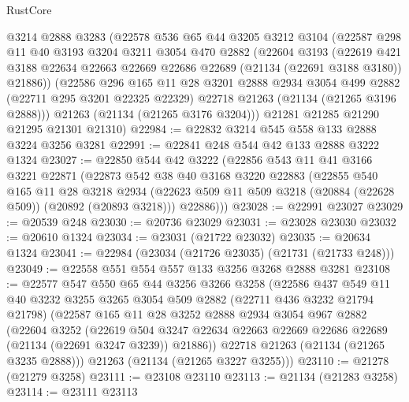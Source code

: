 \begin{lexlean}{RustCore}
\begin{coremodule}
    @3214
    @2888
    @3283
    (@22578
      @536
      @65
      @44
      @3205
      @3212
      @3104
      (@22587
        @298
        @11
        @40
        @3193
        @3204
        @3211
        @3054
        @470
        @2882
        (@22604
          @3193
          (@22619
            @421
            @3188
            @22634
            @22663
            @22669
            @22686
            @22689
            (@21134 (@22691 @3188 @3180))
            @21886))
        (@22586
          @296
          @165
          @11
          @28
          @3201
          @2888
          @2934
          @3054
          @499
          @2882
          (@22711 @295 @3201 @22325 @22329)
          @22718
          @21263
          (@21134 (@21265 @3196 @2888)))
        @21263
        (@21134 (@21265 @3176 @3204)))
      @21281
      @21285
      @21290
      @21295
      @21301
      @21310)
@22984 := @22832 @3214 @545 @558 @133 @2888 @3224 @3256 @3281
@22991 := @22841 @248 @544 @42 @133 @2888 @3222 @1324
@23027 := @22850
    @544
    @42
    @3222
    (@22856
      @543
      @11
      @41
      @3166
      @3221
      @22871
      (@22873
        @542
        @38
        @40
        @3168
        @3220
        @22883
        (@22855
          @540
          @165
          @11
          @28
          @3218
          @2934
          (@22623 @509 @11 @509 @3218 (@20884 (@22628 @509)) (@20892 (@20893 @3218)))
          @22886)))
@23028 := @22991 @23027
@23029 := @20539 @248
@23030 := @20736 @23029
@23031 := @23028 @23030
@23032 := @20610 @1324
@23034 := @23031 (@21722 @23032)
@23035 := @20634 @1324
@23041 := @22984 (@23034 (@21726 @23035) (@21731 (@21733 @248)))
@23049 := @22558 @551 @554 @557 @133 @3256 @3268 @2888 @3281
@23108 := @22577
    @547
    @550
    @65
    @44
    @3256
    @3266
    @3258
    (@22586
      @437
      @549
      @11
      @40
      @3232
      @3255
      @3265
      @3054
      @509
      @2882
      (@22711 @436 @3232 @21794 @21798)
      (@22587
        @165
        @11
        @28
        @3252
        @2888
        @2934
        @3054
        @967
        @2882
        (@22604
          @3252
          (@22619
            @504
            @3247
            @22634
            @22663
            @22669
            @22686
            @22689
            (@21134 (@22691 @3247 @3239))
            @21886))
        @22718
        @21263
        (@21134 (@21265 @3235 @2888)))
      @21263
      (@21134 (@21265 @3227 @3255)))
@23110 := @21278 (@21279 @3258)
@23111 := @23108 @23110
@23113 := @21134 (@21283 @3258)
@23114 := @23111 @23113

\end{coremodule}
\end{lexlean}
